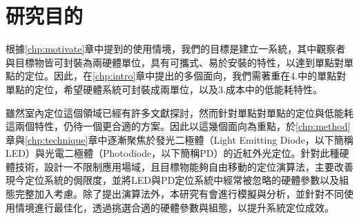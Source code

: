 
\section{研究目的}
\label{chp:purpose}

根據\ref{chp:motivate}章中提到的使用情境，我們的目標是建立一系統，其中觀察者與目標物皆可封裝為兩硬體單位，具有可攜式、易於安裝的特性，以達到單點對單點的定位。因此，在\ref{chp:intro}章中提出的多個面向，我們需著重在4.中的單點對單點的定位，希望硬體系統可封裝成兩單位，以及3.成本中的低能耗特性。

雖然室內定位這個領域已經有許多文獻探討，然而針對單點對單點的定位與低能耗這兩個特性，仍待一個更合適的方案。因此以這幾個面向為重點，於\ref{chp:method}章與\ref{chp:technique}章中逐漸聚焦於發光二極體（Light Emitting Diode，以下簡稱LED）與光電二極體（Photodiode，以下簡稱PD）的近紅外光定位。針對此種硬體技術，設計一不限制應用場域，且目標物能夠自由移動的定位演算法，主要改善現今定位系統的侷限度，並將LED與PD定位系統中經常被忽略的硬體參數以及組態完整加入考慮。除了提出演算法外，本研究有會進行模擬與分析，並針對不同使用情境進行最佳化，透過挑選合適的硬體參數與組態，以提升系統定位成效。











